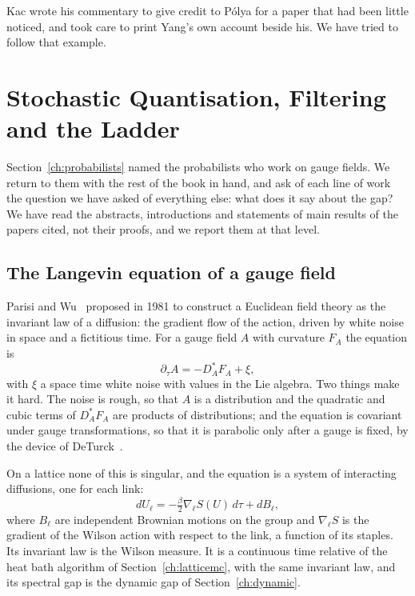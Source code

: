 Kac wrote his commentary to give credit to P\'olya for a paper that had been little noticed, and took care to print Yang's own account beside his. We have tried to follow that example.

\section{Stochastic Quantisation, Filtering and the Ladder}\label{ch:spde}

Section~\ref{ch:probabilists} named the probabilists who work on gauge fields. We return to them with the rest of the book in hand, and ask of each line of work the question we have asked of everything else: what does it say about the gap? We have read the abstracts, introductions and statements of main results of the papers cited, not their proofs, and we report them at that level.

\subsection{The Langevin equation of a gauge field}

Parisi and Wu~\cite{PW81} proposed in 1981 to construct a Euclidean field theory as the invariant law of a diffusion: the gradient flow of the action, driven by white noise in space and a fictitious time. For a gauge field $A$ with curvature $F_A$ the equation is
\[
\partial_\tau A=-D_A^*F_A+\xi ,
\]
with $\xi$ a space time white noise with values in the Lie algebra. Two things make it hard. The noise is rough, so that $A$ is a distribution and the quadratic and cubic terms of $D_A^*F_A$ are products of distributions; and the equation is covariant under gauge transformations, so that it is parabolic only after a gauge is fixed, by the device of DeTurck~\cite{DT83}.

On a lattice none of this is singular, and the equation is a system of interacting diffusions, one for each link:
\[
dU_\ell=-\tfrac\beta2\nabla_\ell S(U)\,d\tau+dB_\ell ,
\]
where $B_\ell$ are independent Brownian motions on the group and $\nabla_\ell S$ is the gradient of the Wilson action with respect to the link, a function of its staples. Its invariant law is the Wilson measure. It is a continuous time relative of the heat bath algorithm of Section~\ref{ch:latticemc}, with the same invariant law, and its spectral gap is the dynamic gap of Section~\ref{ch:dynamic}.

